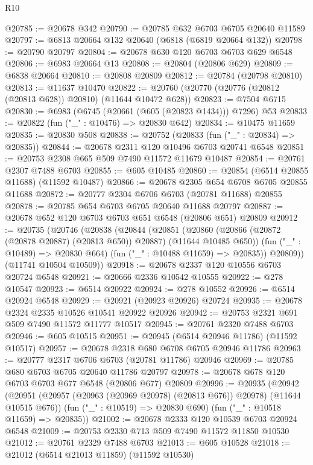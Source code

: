 \begin{lexlean}{R10}
\begin{coremodule}
@20785 := @20678 @342
@20790 := @20785 @632 @6703 @6705 @20640 @11589
@20797 := @6813 @20664 @132 @20640 (@6818 (@6819 @20664 @132))
@20798 := @20790 @20797
@20804 := @20678 @630 @120 @6703 @6703 @629 @6548
@20806 := @6983 @20664 @13
@20808 := @20804 (@20806 @629)
@20809 := @6838 @20664
@20810 := @20808 @20809
@20812 := @20784 (@20798 @20810)
@20813 := @11637 @10470
@20822 := @20760 (@20770 (@20776 (@20812 (@20813 @628)) @20810) (@11644 @10472 @628))
@20823 := @7504 @6715
@20830 := @6983 (@6745 (@20661 (@605 (@20823 @1434))) @7296) @53
@20833 := @20822 (fun ("_" : @10476) => @20830 @642)
@20834 := @10475 @11659
@20835 := @20830 @508
@20838 := @20752 (@20833 (fun ("_" : @20834) => @20835))
@20844 := @20678 @2311 @120 @10496 @6703 @20741 @6548
@20851 := @20753 @2308 @665 @509 @7490 @11572 @11679 @10487
@20854 := @20761 @2307 @7488 @6703
@20855 := @605 @10485
@20860 := @20854 (@6514 @20855 @11688) (@11592 @10487)
@20866 := @20678 @2305 @654 @6708 @6705 @20855 @11688
@20872 := @20777 @2304 @6706 @6703 (@20781 @11688) @20855
@20878 := @20785 @654 @6703 @6705 @20640 @11688 @20797
@20887 := @20678 @652 @120 @6703 @6703 @651 @6548 (@20806 @651) @20809
@20912 := @20735
    (@20746
      (@20838
        (@20844
          (@20851
            (@20860 (@20866 (@20872 (@20878 @20887) (@20813 @650)) @20887) (@11644 @10485 @650))
            (fun ("_" : @10489) => @20830 @664)
            (fun ("_" : @10488 @11659) => @20835))
          @20809))
      (@11741 @10504 @10509))
@20918 := @20678 @2337 @120 @10556 @6703 @20724 @6548
@20921 := @20666 @2336 @10542 @10555
@20922 := @278 @10547
@20923 := @6514 @20922
@20924 := @278 @10552
@20926 := @6514 @20924 @6548
@20929 := @20921 (@20923 @20926) @20724
@20935 := @20678 @2324 @2335 @10526 @10541 @20922 @20926
@20942 := @20753 @2321 @691 @509 @7490 @11572 @11777 @10517
@20945 := @20761 @2320 @7488 @6703
@20946 := @605 @10515
@20951 := @20945 (@6514 @20946 @11786) (@11592 @10517)
@20957 := @20678 @2318 @680 @6708 @6705 @20946 @11786
@20963 := @20777 @2317 @6706 @6703 (@20781 @11786) @20946
@20969 := @20785 @680 @6703 @6705 @20640 @11786 @20797
@20978 := @20678 @678 @120 @6703 @6703 @677 @6548 (@20806 @677) @20809
@20996 := @20935
    (@20942
      (@20951 (@20957 (@20963 (@20969 @20978) (@20813 @676)) @20978) (@11644 @10515 @676))
      (fun ("_" : @10519) => @20830 @690)
      (fun ("_" : @10518 @11659) => @20835))
@21002 := @20678 @2333 @120 @10539 @6703 @20924 @6548
@21009 := @20753 @2330 @713 @509 @7490 @11572 @11850 @10530
@21012 := @20761 @2329 @7488 @6703
@21013 := @605 @10528
@21018 := @21012 (@6514 @21013 @11859) (@11592 @10530)

\end{coremodule}
\end{lexlean}
